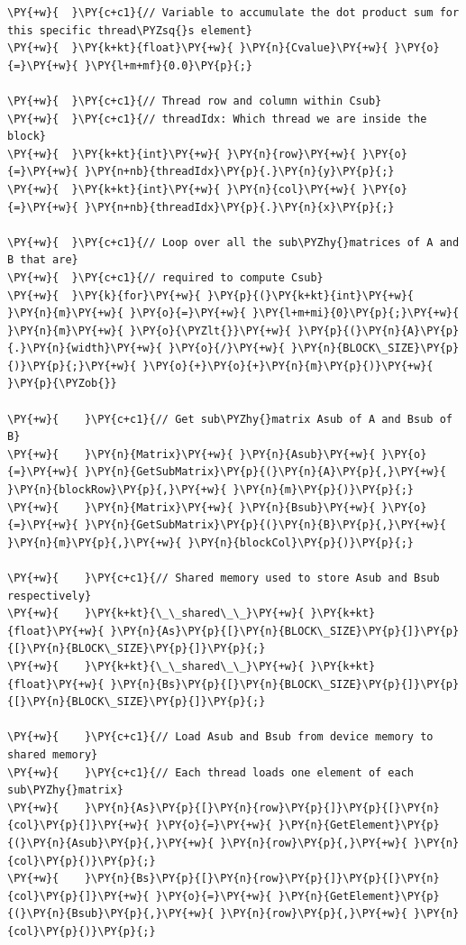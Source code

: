 \begin{Verbatim}[label=\makebox{\url{https://github.com/lucabaldini/cmepda/tree/master/slides/latex/snippets/MatrixMultiplication_shared.cu}},commandchars=\\\{\}]
\PY{+w}{  }\PY{c+c1}{// Variable to accumulate the dot product sum for this specific thread\PYZsq{}s element}
\PY{+w}{  }\PY{k+kt}{float}\PY{+w}{ }\PY{n}{Cvalue}\PY{+w}{ }\PY{o}{=}\PY{+w}{ }\PY{l+m+mf}{0.0}\PY{p}{;}

\PY{+w}{  }\PY{c+c1}{// Thread row and column within Csub}
\PY{+w}{  }\PY{c+c1}{// threadIdx: Which thread we are inside the block}
\PY{+w}{  }\PY{k+kt}{int}\PY{+w}{ }\PY{n}{row}\PY{+w}{ }\PY{o}{=}\PY{+w}{ }\PY{n+nb}{threadIdx}\PY{p}{.}\PY{n}{y}\PY{p}{;}
\PY{+w}{  }\PY{k+kt}{int}\PY{+w}{ }\PY{n}{col}\PY{+w}{ }\PY{o}{=}\PY{+w}{ }\PY{n+nb}{threadIdx}\PY{p}{.}\PY{n}{x}\PY{p}{;}

\PY{+w}{  }\PY{c+c1}{// Loop over all the sub\PYZhy{}matrices of A and B that are}
\PY{+w}{  }\PY{c+c1}{// required to compute Csub}
\PY{+w}{  }\PY{k}{for}\PY{+w}{ }\PY{p}{(}\PY{k+kt}{int}\PY{+w}{ }\PY{n}{m}\PY{+w}{ }\PY{o}{=}\PY{+w}{ }\PY{l+m+mi}{0}\PY{p}{;}\PY{+w}{ }\PY{n}{m}\PY{+w}{ }\PY{o}{\PYZlt{}}\PY{+w}{ }\PY{p}{(}\PY{n}{A}\PY{p}{.}\PY{n}{width}\PY{+w}{ }\PY{o}{/}\PY{+w}{ }\PY{n}{BLOCK\_SIZE}\PY{p}{)}\PY{p}{;}\PY{+w}{ }\PY{o}{+}\PY{o}{+}\PY{n}{m}\PY{p}{)}\PY{+w}{ }\PY{p}{\PYZob{}}

\PY{+w}{    }\PY{c+c1}{// Get sub\PYZhy{}matrix Asub of A and Bsub of B}
\PY{+w}{    }\PY{n}{Matrix}\PY{+w}{ }\PY{n}{Asub}\PY{+w}{ }\PY{o}{=}\PY{+w}{ }\PY{n}{GetSubMatrix}\PY{p}{(}\PY{n}{A}\PY{p}{,}\PY{+w}{ }\PY{n}{blockRow}\PY{p}{,}\PY{+w}{ }\PY{n}{m}\PY{p}{)}\PY{p}{;}
\PY{+w}{    }\PY{n}{Matrix}\PY{+w}{ }\PY{n}{Bsub}\PY{+w}{ }\PY{o}{=}\PY{+w}{ }\PY{n}{GetSubMatrix}\PY{p}{(}\PY{n}{B}\PY{p}{,}\PY{+w}{ }\PY{n}{m}\PY{p}{,}\PY{+w}{ }\PY{n}{blockCol}\PY{p}{)}\PY{p}{;}

\PY{+w}{    }\PY{c+c1}{// Shared memory used to store Asub and Bsub respectively}
\PY{+w}{    }\PY{k+kt}{\_\_shared\_\_}\PY{+w}{ }\PY{k+kt}{float}\PY{+w}{ }\PY{n}{As}\PY{p}{[}\PY{n}{BLOCK\_SIZE}\PY{p}{]}\PY{p}{[}\PY{n}{BLOCK\_SIZE}\PY{p}{]}\PY{p}{;}
\PY{+w}{    }\PY{k+kt}{\_\_shared\_\_}\PY{+w}{ }\PY{k+kt}{float}\PY{+w}{ }\PY{n}{Bs}\PY{p}{[}\PY{n}{BLOCK\_SIZE}\PY{p}{]}\PY{p}{[}\PY{n}{BLOCK\_SIZE}\PY{p}{]}\PY{p}{;}

\PY{+w}{    }\PY{c+c1}{// Load Asub and Bsub from device memory to shared memory}
\PY{+w}{    }\PY{c+c1}{// Each thread loads one element of each sub\PYZhy{}matrix}
\PY{+w}{    }\PY{n}{As}\PY{p}{[}\PY{n}{row}\PY{p}{]}\PY{p}{[}\PY{n}{col}\PY{p}{]}\PY{+w}{ }\PY{o}{=}\PY{+w}{ }\PY{n}{GetElement}\PY{p}{(}\PY{n}{Asub}\PY{p}{,}\PY{+w}{ }\PY{n}{row}\PY{p}{,}\PY{+w}{ }\PY{n}{col}\PY{p}{)}\PY{p}{;}
\PY{+w}{    }\PY{n}{Bs}\PY{p}{[}\PY{n}{row}\PY{p}{]}\PY{p}{[}\PY{n}{col}\PY{p}{]}\PY{+w}{ }\PY{o}{=}\PY{+w}{ }\PY{n}{GetElement}\PY{p}{(}\PY{n}{Bsub}\PY{p}{,}\PY{+w}{ }\PY{n}{row}\PY{p}{,}\PY{+w}{ }\PY{n}{col}\PY{p}{)}\PY{p}{;}


\end{Verbatim}
